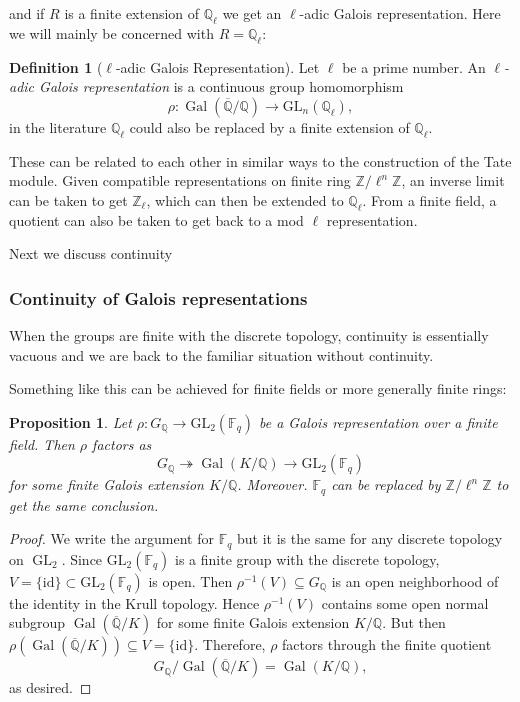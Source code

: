 \documentclass{article}
\newtheorem{proposition}{Proposition}[section]
\theoremstyle{definition}
\newtheorem{definition}{Definition}[section]
\theoremstyle{definition}
\theoremstyle{definition}
\newcommand{\gl}{\operatorname{GL}}
\newcommand{\Z}{\mathbb{Z}}
\newcommand{\Q}{\mathbb{Q}}
\newcommand{\F}{\mathbb{F}}
\begin{document}
and if $R$ is a finite extension of $\Q_\ell$ we get an $\ell$-adic Galois representation. Here we will mainly be concerned with $R=\Q_\ell$:

\begin{definition}[\(\ell\)-adic Galois Representation]
Let \(\ell\) be a prime number. An \emph{\(\ell\)-adic Galois representation} is a continuous group homomorphism
\[
\rho : \operatorname{Gal}(\overline{\mathbb{Q}}/\mathbb{Q}) \longrightarrow \mathrm{GL}_n(\Q_\ell),
\]
in the literature $\Q_\ell$ could also be replaced by a finite extension of $\Q_\ell$.
\end{definition}

These can be related to each other in similar ways to the construction of the Tate module. Given compatible representations on finite ring $\Z/\ell^n\Z$, an inverse limit can be taken to get $\Z_\ell$, which can then be extended to $\Q_\ell$. From a finite field, a quotient can also be taken to get back to a mod $\ell$ representation.

Next we discuss continuity 

\subsubsection{Continuity of Galois representations}

When the groups are finite with the discrete topology, continuity is essentially vacuous and we are back to the familiar situation without continuity.

Something like this can be achieved for finite fields or more generally finite rings:

\begin{proposition}
Let \( \rho : G_{\mathbb{Q}} \to \mathrm{GL}_2(\mathbb{F}_q) \) be a Galois representation over a finite field. Then \( \rho \) factors as
\[
G_{\mathbb{Q}} \twoheadrightarrow \operatorname{Gal}(K/\mathbb{Q}) \to \mathrm{GL}_2(\mathbb{F}_q)
\]
for some finite Galois extension \( K/\mathbb{Q} \). Moreover. $\F_q$ can be replaced by $\Z/\ell^n\Z$ to get the same conclusion.
\end{proposition}

\begin{proof} We write the argument for $\F_q$ but it is the same for any discrete topology on $\gl_2$.
Since \( \mathrm{GL}_2(\mathbb{F}_q) \) is a finite group with the discrete topology,  $V=\{\mathrm{id}\}\subset \mathrm{GL}_2(\mathbb{F}_q)$ is open. Then \( \rho^{-1}(V) \subseteq G_{\mathbb{Q}} \) is an open neighborhood of the identity in the Krull topology. Hence \( \rho^{-1}(V) \) contains some open normal subgroup \( \operatorname{Gal}(\overline{\mathbb{Q}}/K) \) for some finite Galois extension \( K/\mathbb{Q} \).
\newline\newline
But then \( \rho(\operatorname{Gal}(\overline{\mathbb{Q}}/K)) \subseteq V = \{\mathrm{id}\} \).
\newline\newline
Therefore, \( \rho \) factors through the finite quotient
\[
G_{\mathbb{Q}} / \operatorname{Gal}(\overline{\mathbb{Q}}/K) = \operatorname{Gal}(K/\mathbb{Q}),
\]
as desired.
\end{proof}
\end{document}
